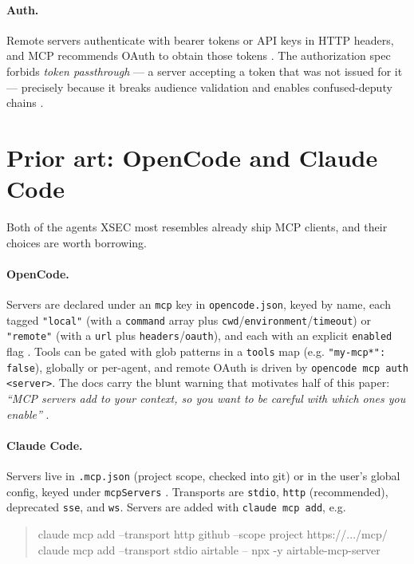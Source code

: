 \documentclass[11pt]{article}
\begin{document}
\paragraph{Auth.} Remote servers authenticate with bearer tokens or API keys in
HTTP headers, and MCP recommends OAuth to obtain those tokens
\cite{mcp-arch,mcp-security}. The authorization spec forbids
\emph{token passthrough} --- a server accepting a token that was not issued for
it --- precisely because it breaks audience validation and enables confused-deputy
chains \cite{mcp-security}.

\section{Prior art: OpenCode and Claude Code}

Both of the agents XSEC most resembles already ship MCP clients, and their
choices are worth borrowing.

\paragraph{OpenCode.} Servers are declared under an \texttt{mcp} key in
\texttt{opencode.json}, keyed by name, each tagged \texttt{"local"} (with a
\texttt{command} array plus \texttt{cwd}/\texttt{environment}/\texttt{timeout}) or
\texttt{"remote"} (with a \texttt{url} plus \texttt{headers}/\texttt{oauth}), and
each with an explicit \texttt{enabled} flag \cite{opencode-mcp}. Tools can be
gated with glob patterns in a \texttt{tools} map (e.g. \texttt{"my-mcp*": false}),
globally or per-agent, and remote OAuth is driven by
\texttt{opencode mcp auth <server>}. The docs carry the blunt warning that
motivates half of this paper: \emph{``MCP servers add to your context, so you
want to be careful with which ones you enable''} \cite{opencode-mcp}.

\paragraph{Claude Code.} Servers live in \texttt{.mcp.json} (project scope,
checked into git) or in the user's global config, keyed under
\texttt{mcpServers} \cite{claudecode-mcp}. Transports are \texttt{stdio},
\texttt{http} (recommended), deprecated \texttt{sse}, and \texttt{ws}. Servers
are added with \texttt{claude mcp add}, e.g.

\begin{quote}
\ttfamily
claude mcp add --transport http github --scope project https://.../mcp/\\
claude mcp add --transport stdio airtable -- npx -y airtable-mcp-server
\end{quote}
\end{document}
